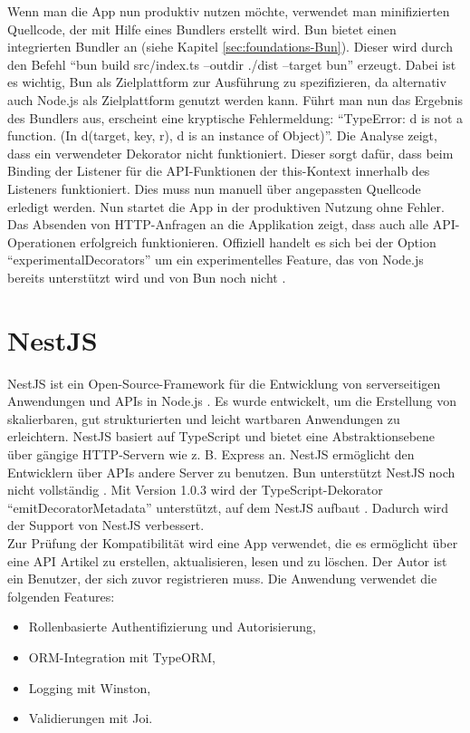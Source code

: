 \noindent
Wenn man die App nun produktiv nutzen möchte, verwendet man minifizierten Quellcode, der mit Hilfe eines Bundlers erstellt wird. Bun bietet einen integrierten Bundler an (siehe Kapitel \ref{sec:foundations-Bun}). Dieser wird durch den Befehl ``bun build src/index.ts --outdir ./dist --target bun'' erzeugt. Dabei ist es wichtig, Bun als Zielplattform zur Ausführung zu spezifizieren, da alternativ auch Node.js als Zielplattform genutzt werden kann. Führt man nun das Ergebnis des Bundlers aus, erscheint eine kryptische Fehlermeldung: ``TypeError: d is not a function. (In d(target, key, r), d is an instance of Object)''. Die Analyse zeigt, dass ein verwendeter Dekorator nicht funktioniert. Dieser sorgt dafür, dass beim Binding der Listener für die API-Funktionen  der this-Kontext innerhalb des Listeners funktioniert. Dies muss nun manuell über angepassten Quellcode erledigt werden. Nun startet die App in der produktiven Nutzung ohne Fehler. Das Absenden von HTTP-Anfragen an die Applikation zeigt, dass auch alle API-Operationen erfolgreich funktionieren. Offiziell handelt es sich bei der Option ``experimentalDecorators'' um ein experimentelles Feature, das von Node.js bereits unterstützt wird und von Bun noch nicht \cite{Microsoft.2023}.

\section{NestJS} \label{sec:compabitility-nestjs}
NestJS ist ein Open-Source-Framework für die Entwicklung von serverseitigen Anwendungen und APIs in Node.js \cite{Mysliwiec.2023}. Es wurde entwickelt, um die Erstellung von skalierbaren, gut strukturierten und leicht wartbaren Anwendungen zu erleichtern. NestJS basiert auf TypeScript und bietet eine Abstraktionsebene über gängige HTTP-Servern wie z. B. Express an. NestJS ermöglicht den Entwicklern über APIs andere Server zu benutzen. Bun unterstützt NestJS noch nicht vollständig \cite{Sumner.2022}. Mit Version 1.0.3 wird der TypeScript-Dekorator ``emitDecoratorMetadata'' unterstützt, auf dem NestJS aufbaut \cite{McDonnel.2023}. Dadurch wird der Support von NestJS verbessert.\\

\noindent
Zur Prüfung der Kompatibilität wird eine App verwendet, die es ermöglicht über eine API Artikel zu erstellen, aktualisieren, lesen und zu löschen. Der Autor ist ein Benutzer, der sich zuvor registrieren muss. Die Anwendung verwendet die folgenden Features:

\begin{itemize}
	\item Rollenbasierte Authentifizierung und Autorisierung,
	\item ORM-Integration mit TypeORM,
	\item Logging mit Winston,
	\item Validierungen mit Joi.
\end{itemize}

